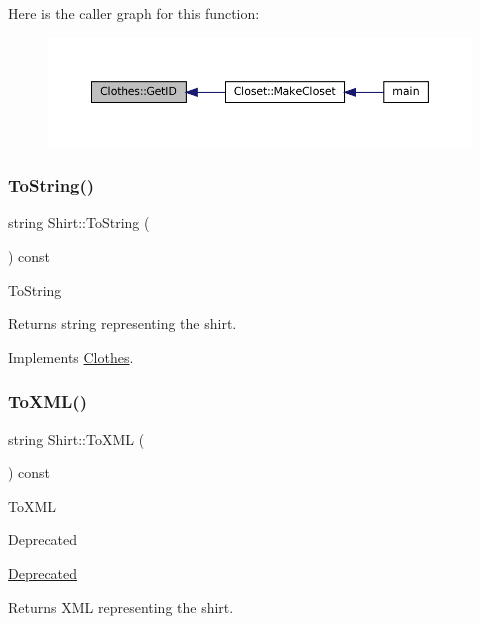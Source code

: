 Here is the caller graph for this function\+:\nopagebreak
\begin{figure}[H]
\begin{center}
\leavevmode
\includegraphics[width=350pt]{classClothes_a3f6dac172f333126d19010f85ec44e4c_icgraph}
\end{center}
\end{figure}
\mbox{\label{classShirt_ab85aaa20a603d63f4144d1b42d9b616d}} 
\subsubsection{\texorpdfstring{To\+String()}{ToString()}}
{\footnotesize\ttfamily string Shirt\+::\+To\+String (\begin{DoxyParamCaption}{ }\end{DoxyParamCaption}) const\hspace{0.3cm}{\ttfamily [virtual]}}

To\+String \begin{DoxyReturn}{Returns}
\textquotesingle{}string\textquotesingle{} representing the shirt. 
\end{DoxyReturn}


Implements \mbox{\hyperlink{classClothes_a953d143394e9a2c007ab0c3a638973cf}{Clothes}}.

\mbox{\label{classShirt_ae636e58135bd1ca4ac590e55e8d47cac}} 
\subsubsection{\texorpdfstring{To\+X\+M\+L()}{ToXML()}}
{\footnotesize\ttfamily string Shirt\+::\+To\+X\+ML (\begin{DoxyParamCaption}{ }\end{DoxyParamCaption}) const}

To\+X\+ML \begin{DoxyRefDesc}{Deprecated}
\item[\mbox{\hyperlink{deprecated__deprecated000003}{Deprecated}}]\end{DoxyRefDesc}
\begin{DoxyReturn}{Returns}
X\+ML representing the shirt. 
\end{DoxyReturn}


